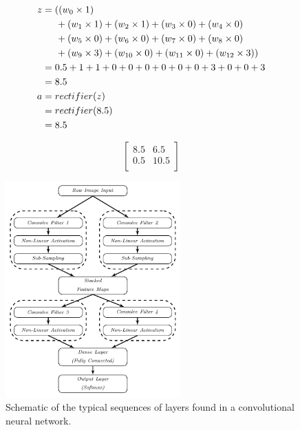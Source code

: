 \documentclass[xcolor={table}]{beamer}
\begin{document}
 \begin{frame} 
 \begin{alignat}{2}
z&= ( ( w_0 \times 1)\notag\\
   &\hspace{0.5cm}+ (w_1 \times 1) + (w_2 \times 1) + (w_3 \times 0) + (w_4\times0) \notag \\
   &\hspace{0.5cm}+ ( w_5 \times 0) + (w_6 \times 0) + (w_7 \times 0) + (w_8 \times 0) \notag\\
   &\hspace{0.5cm}+ ( w_9 \times 3) + (w_{10} \times 0) + (w_{11} \times 0) + (w_{12} \times 3)) \notag\\ 
   &= 0.5 + 1 + 1 + 0 + 0 + 0 + 0 + 0 + 0 + 3 + 0 + 0 + 3 \notag\\
   &= 8.5\notag\\
 a&=rectifier(z)\notag\\
 &=rectifier(8.5)\notag\\
   &=8.5
   \label{eqn:relufilteractivationcalc}
\end{alignat}
\end{frame} 



 \begin{frame} 
 \begin{equation}
    \left[ {\begin{array}{ccc}
   8.5 & 6.5 \\
   0.5 & 10.5 \\
  \end{array} } \right]
  \label{eqn:2dfeaturemap}
\end{equation}
\end{frame} 



 \begin{frame}[plain]
\begin{figure}[!b]
\centerline{
\includegraphics[width=0.6\textwidth]{./images/fmlpda_8_35.pdf}
}
\caption{Schematic of the typical sequences of layers found in a convolutional neural network.}
\label{fig:cnn-architecture}
\end{figure}
\end{frame} 
\end{document}
